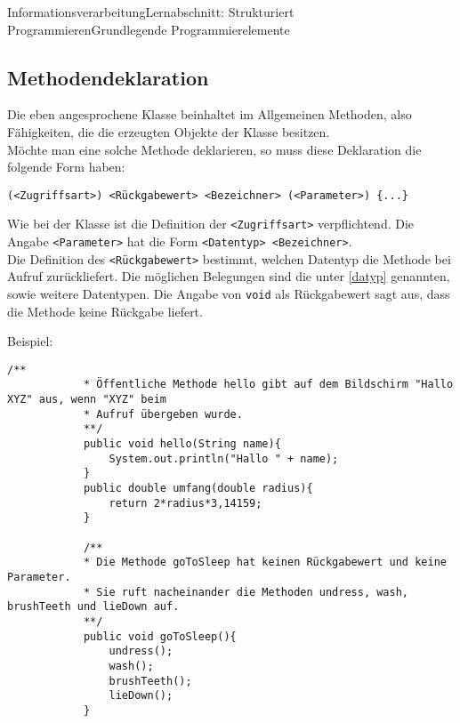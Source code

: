 \documentclass[11pt,oneside,openany,headings=optiontotoc,11pt,numbers=noenddot]{article}
\begin{document}
\begin{worksheet}{Informationsverarbeitung}{Lernabschnitt: Strukturiert Programmieren}{Grundlegende Programmierelemente}
		\subsection{Methodendeklaration}
		Die eben angesprochene Klasse beinhaltet im Allgemeinen Methoden, also \glqq{}Fähigkeiten\grqq{}, die die erzeugten Objekte der Klasse besitzen.\\
		Möchte man eine solche Methode deklarieren, so muss diese Deklaration die folgende Form haben:
		\begin{lstlisting}[style=JavaInputStyle]
			(<Zugriffsart>) <Rückgabewert> <Bezeichner> (<Parameter>) {...}
		\end{lstlisting}
		Wie bei der Klasse ist die Definition der \lstinline[style=JavaInputStyle]{<Zugriffsart>} verpflichtend. Die Angabe \lstinline[style=JavaInputStyle]{<Parameter>} hat die Form \lstinline[style=JavaInputStyle]{<Datentyp> <Bezeichner>}.\\
		Die Definition des \lstinline[style=JavaInputStyle]{<Rückgabewert>} bestimmt, welchen Datentyp die Methode bei Aufruf zurückliefert. Die möglichen Belegungen sind die unter \ref{datyp} genannten, sowie weitere Datentypen. Die Angabe von \lstinline[style=JavaInputStyle]{void} als Rückgabewert sagt aus, dass die Methode keine Rückgabe liefert.\\
		\par\noindent
		Beispiel:
		\begin{lstlisting}[style=JavaInputStyle,frame=single]
			/**
			* Öffentliche Methode hello gibt auf dem Bildschirm "Hallo XYZ" aus, wenn "XYZ" beim
			* Aufruf übergeben wurde.
			**/
			public void hello(String name){
				System.out.println("Hallo " + name);
			}			
			public double umfang(double radius){
				return 2*radius*3,14159;
			}
			
			/**
			* Die Methode goToSleep hat keinen Rückgabewert und keine Parameter.
			* Sie ruft nacheinander die Methoden undress, wash, brushTeeth und lieDown auf.
			**/
			public void goToSleep(){
				undress();
				wash();
				brushTeeth();
				lieDown();
			}
		\end{lstlisting}

\end{worksheet}
\end{document}
